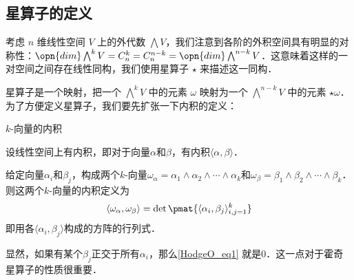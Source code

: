 


\subsection{星算子的定义}

考虑 $n$ 维线性空间 $V$ 上的外代数 $\bigwedge V$，我们注意到各阶的外积空间具有明显的对称性：$\opn{dim}\bigwedge^k V=C^k_n=C^{n-k}_n=\opn{dim}\bigwedge^{n-k} V$．这意味着这样的一对空间之间存在线性同构，我们使用星算子 $\star$ 来描述这一同构．

星算子是一个映射，把一个 $\bigwedge^k V$ 中的元素 $\omega$ 映射为一个 $\bigwedge^{n-k} V$ 中的元素 $\star\omega$．为了方便定义星算子，我们要先扩张一下内积的定义：


\begin{definition}{$k$-向量的内积}

设线性空间上有内积，即对于向量$\alpha$和$\beta$，有内积$\langle \alpha, \beta \rangle$．

给定向量$\alpha_i$和$\beta_j$，构成两个$k$-向量$\omega_\alpha=\alpha_1\wedge\alpha_2\wedge\cdots\wedge\alpha_k$和$\omega_\beta=\beta_1\wedge\beta_2\wedge\cdots\wedge\beta_k$．则这两个$k$-向量的内积定义为
\begin{equation}\label{HodgeO_eq1}
\langle\omega_\alpha, \omega_\beta\rangle = \det \pmat{\langle \alpha_i, \beta_j \rangle_{i, j=1}^k}
\end{equation}
即用各$\langle \alpha_i, \beta_j \rangle$构成的方阵的行列式．

\end{definition}

显然，如果有某个$\beta_j$正交于所有$\alpha_i$，那么\autoref{HodgeO_eq1} 就是$0$．这一点对于霍奇星算子的性质很重要．







